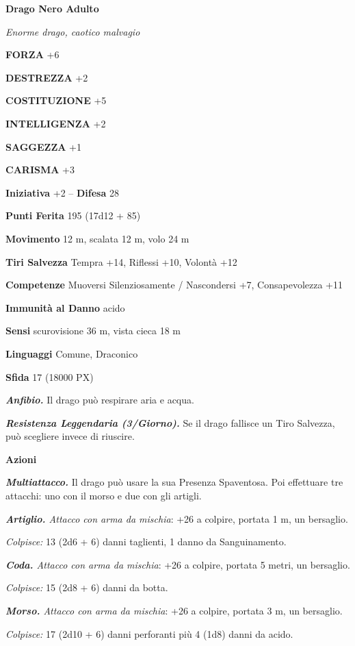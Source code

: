 \begin{multicols}{2}
\medskip{}\textbf{Drago Nero Adulto}

\textit{Enorme drago, caotico malvagio}

\textbf{FORZA} +6

\textbf{DESTREZZA} +2

\textbf{COSTITUZIONE} +5

\textbf{INTELLIGENZA} +2

\textbf{SAGGEZZA} +1

\textbf{CARISMA} +3

\textbf{Iniziativa} +2 -- \textbf{Difesa} 28

\textbf{Punti Ferita} 195 (17d12 + 85)

\textbf{Movimento} 12 m, scalata 12 m, volo 24 m

\textbf{Tiri Salvezza} Tempra +14, Riflessi +10, Volontà +12

\textbf{Competenze} Muoversi Silenziosamente / Nascondersi +7, Consapevolezza +11

\textbf{Immunità al Danno} acido

\textbf{Sensi} scurovisione 36 m, vista cieca 18 m

\textbf{Linguaggi} Comune, Draconico

\textbf{Sfida} 17 (18000 PX)

\textit{\textbf{Anfibio.}} Il drago può respirare aria e acqua.

\textit{\textbf{Resistenza Leggendaria (3/Giorno).}} Se il drago fallisce un Tiro Salvezza, può scegliere invece di riuscire.

\textbf{Azioni}

\textit{\textbf{Multiattacco.}} Il drago può usare la sua Presenza Spaventosa. Poi effettuare tre attacchi: uno con il morso e due con gli artigli.

\textit{\textbf{Artiglio.} Attacco con arma da mischia}: +26 a colpire, portata 1 m, un bersaglio.

\textit{Colpisce:} 13 (2d6 + 6) danni taglienti, 1 danno da Sanguinamento.

\textit{\textbf{Coda.} Attacco con arma da mischia}: +26 a colpire, portata 5 metri, un bersaglio.

\textit{Colpisce:} 15 (2d8 + 6) danni da botta.

\textit{\textbf{Morso.} Attacco con arma da mischia}: +26 a colpire, portata 3 m, un bersaglio.

\textit{Colpisce:} 17 (2d10 + 6) danni perforanti più 4 (1d8) danni da acido.


\end{multicols}
